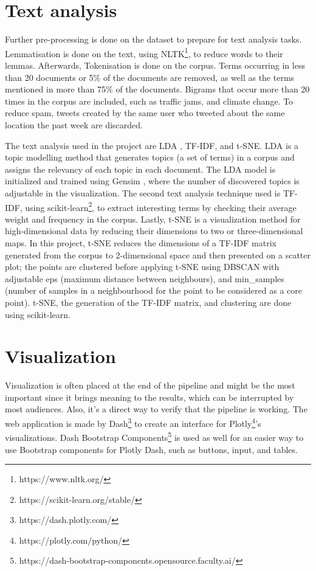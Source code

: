 \section{Text analysis}
  
Further pre-processing is done on the dataset to prepare for text analysis tasks. Lemmatisation is
done on the text, using \ac{NLTK}\footnote{https://www.nltk.org/}, to reduce words to their lemmas.
Afterwards, Tokenisation is done on the corpus. Terms occurring in less than 20 documents or 5\% of
the documents are removed, as well as the terms mentioned in more than 75\% of the documents.
Bigrams that occur more than 20 times in the corpus are included, such as traffic jams, and climate
change. To reduce spam, tweets created by the same user who tweeted about the same location the past
week are discarded.

The text analysis used in the project are \ac{LDA} \cite{pritchardInferencePopulationStructure2000}
\cite{falushInferencePopulationStructure2003}, \ac{TF-IDF}, and
\ac{t-SNE}\cite{vandermaatenVisualizingHighDimensionalData2008}. \ac{LDA} is a topic modelling
method that generates topics (a set of terms) in a corpus and assigns the relevancy of each topic in
each document. The \ac{LDA} model is initialized and trained using Gensim \cite{rehurek_lrec},
where the number of discovered topics is adjustable in the visualization. The second text analysis
technique used is \ac{TF-IDF}, using scikit-learn\footnote{https://scikit-learn.org/stable/}, to
extract interesting terms by checking their average weight and frequency in the corpus. Lastly,
\ac{t-SNE} is a visualization method for high-dimensional data by reducing their dimensions to two
or three-dimensional maps. In this project, \ac{t-SNE} reduces the dimensions of a \ac{TF-IDF}
matrix generated from the corpus to 2-dimensional space and then presented on a scatter plot; the
points are clustered before applying \ac{t-SNE} using \ac{DBSCAN} with adjustable eps (maximum
distance between neighbours), and min\_samples (number of samples in a neighbourhood for the
point to be considered as a core point). \ac{t-SNE}, the generation of the \ac{TF-IDF} matrix, and
clustering are done using scikit-learn.

\section{Visualization}

  Visualization is often placed at the end of the pipeline and might be the most important since it
  brings meaning to the results, which can be interrupted by most audiences. Also, it's a direct way
  to verify that the pipeline is working. The web application is made by
  Dash\footnote{https://dash.plotly.com/} to create an interface for
  Plotly\footnote{https://plotly.com/python/}'s visualizations. Dash Bootstrap
  Components\footnote{https://dash-bootstrap-components.opensource.faculty.ai/} is used as well for
  an easier way to use Bootstrap components for Plotly Dash, such as buttons, input, and tables.

